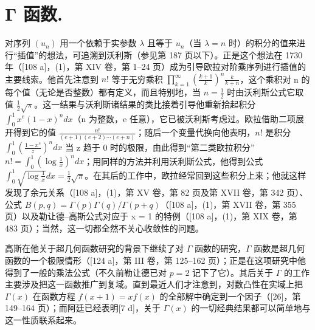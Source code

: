 \chapter{Γ 函数.}

对序列 \((u_{n})\) 用一个依赖于实参数 \(\lambda\) 且等于 \(u_{n}\)（当 \(\lambda = n\) 时）的积分的值来进行“插值”的想法，可追溯到沃利斯（参见第 187 页以下）。正是这个想法在 1730 年（{[}108 a{]}，(1)，第 XIV 卷，第 1–24 页）成为引导欧拉对阶乘序列进行插值的主要线索。他首先注意到 \(n!\) 等于无穷乘积 \(\prod_{k=1}^{\infty}\left(\frac{k+1}{k}\right)^{n}\frac{k}{k+n}\)，这个乘积对 n 的每个值（无论是否整数）都有定义，而且特别地，当 \(n = \frac{1}{2}\) 时由沃利斯公式它取值 \(\frac{1}{2}\sqrt{\pi}\)。这一结果与沃利斯诸结果的类比接着引导他重新拾起积分 \(\int_{0}^{1} x^{e}(1-x)^{n} dx\)（n 为整数，e 任意），它已被沃利斯考虑过。欧拉借助二项展开得到它的值 \(\frac{n!}{(e+1)(e+2)\cdots(e+n)}\)；随后一个变量代换向他表明，\(n!\) 是积分 \(\int_{0}^{1}\left(\frac{1-x^{s}}{z}\right)^{n} dx\) 当 z 趋于 0 时的极限，由此得到“第二类欧拉积分”\(n! = \int_{0}^{1}\left(\log\frac{1}{x}\right)^{n} dx\)；用同样的方法并利用沃利斯公式，他得到公式 \(\int_{0}^{1}\sqrt{\log\frac{1}{x}} dx = \frac{1}{2}\sqrt{\pi}\)。在其后的工作中，欧拉经常回到这些积分上来；他就这样发现了余元关系（{[}108 a{]}，(1)，第 XV 卷，第 82 页及第 XVII 卷，第 342 页）、公式 \(B(p,q) = \Gamma(p)\Gamma(q)/\Gamma(p+q)\)（{[}108 a{]}，(1)，第 XVII 卷，第 355 页）以及勒让德–高斯公式对应于 x = 1 的特例（{[}108 a{]}，(1)，第 XIX 卷，第 483 页）；当然，这一切都全然不关心收敛性的问题。

高斯在他关于超几何函数研究的背景下继续了对 \(\Gamma\) 函数的研究，\(\Gamma\) 函数是超几何函数的一个极限情形（{[}124 a{]}，第 III 卷，第 125–162 页）；正是在这项研究中他得到了一般的乘法公式（不久前勒让德已对 \(p = 2\) 记下了它）。其后关于 \(\Gamma\) 的工作主要涉及把这一函数推广到复域。直到最近人们才注意到，对数凸性在实域上把 \(\Gamma(x)\) 在函数方程 \(f(x + 1) = xf(x)\) 的全部解中确定到一个因子（{[}26{]}，第 149–164 页）；而阿廷已经表明{[}7 d{]}，关于 \(\Gamma(x)\) 的一切经典结果都可以简单地与这一性质联系起来。

